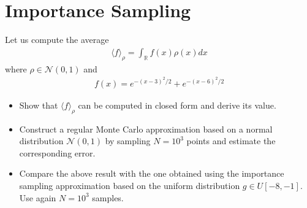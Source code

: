 \documentclass[../main.tex]{subfiles}
\begin{document}
\section{Importance Sampling}
Let us compute the average
\begin{align}
    \langle f \rangle_\rho = \int_\mathbb{R} f(x)\rho(x)dx
\end{align}where $\rho \in \mathcal{N}(0,1)$ and
\begin{align}
    f(x) = e^{-(x-3)^2/2} + e^{-(x-6)^2/2}
\end{align}
\begin{itemize}
    \item Show that $\langle f \rangle_\rho$ can be computed in closed form and derive its value.
    \item Construct a regular Monte Carlo approximation based on a normal distribution $\mathcal{N}(0,1)$ by sampling $N=10^3$ points and estimate the corresponding error.
    \item Compare the above result with the one obtained using the importance sampling approximation based on the uniform distribution $g \in U[-8, -1]$. Use again $N=10^3$ samples.
\end{itemize}
\end{document}
